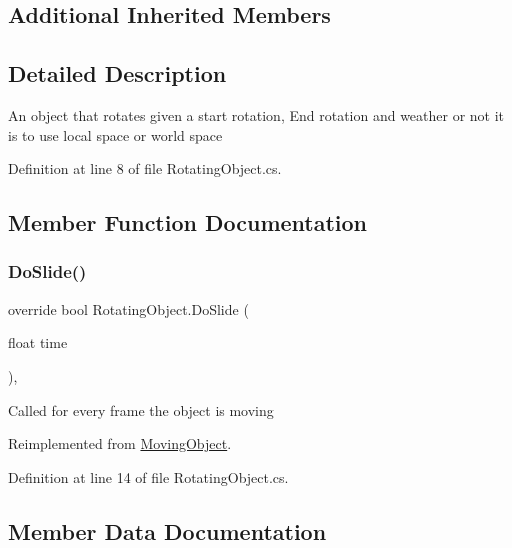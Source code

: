 \subsection*{Additional Inherited Members}


\subsection{Detailed Description}
An object that rotates given a start rotation, End rotation and weather or not it is to use local space or world space 



Definition at line 8 of file Rotating\+Object.\+cs.



\subsection{Member Function Documentation}
\mbox{\label{class_rotating_object_ac1d4caba5c9e39d48195c8b1bc1eb9d0}} 
\subsubsection{\texorpdfstring{Do\+Slide()}{DoSlide()}}
{\footnotesize\ttfamily override bool Rotating\+Object.\+Do\+Slide (\begin{DoxyParamCaption}\item[{float}]{time }\end{DoxyParamCaption})\hspace{0.3cm}{\ttfamily [protected]}, {\ttfamily [virtual]}}



Called for every frame the object is moving 



Reimplemented from \mbox{\hyperlink{class_moving_object_a3ee062f4d319649a0006bc58a9d7a620}{Moving\+Object}}.



Definition at line 14 of file Rotating\+Object.\+cs.



\subsection{Member Data Documentation}
\mbox{\label{class_rotating_object_a7311109e5270d856b0bdeb7048aa12d1}} 
